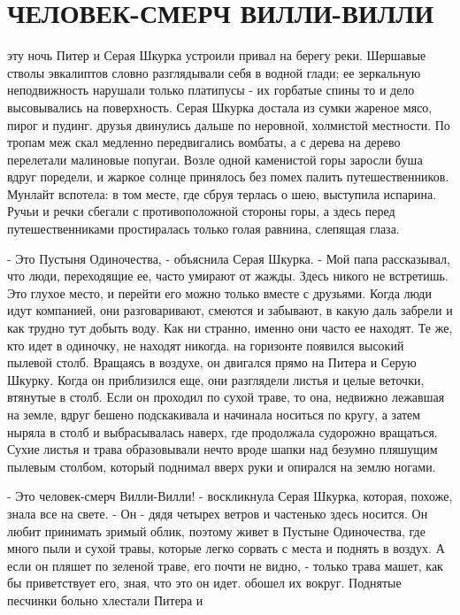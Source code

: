 \chapter{ЧЕЛОВЕК-СМЕРЧ ВИЛЛИ-ВИЛЛИ}
\par{} эту ночь Питер и Серая Шкурка устроили привал на берегу реки. 
Шершавые стволы эвкалиптов словно разглядывали себя в водной глади; ее 
зеркальную неподвижность нарушали только платипусы - их горбатые спины 
то и дело высовывались на поверхность. Серая Шкурка достала из сумки 
жареное мясо, пирог и пудинг.
 друзья двинулись дальше по неровной, холмистой местности. По 
тропам меж скал медленно передвигались вомбаты, а с дерева на дерево 
перелетали малиновые попугаи. Возле одной каменистой горы заросли буша 
вдруг поредели, и жаркое солнце принялось без помех палить 
путешественников. Мунлайт вспотела: в том месте, где сбруя терлась о 
шею, выступила испарина. Ручьи и речки сбегали с противоположной 
стороны горы, а здесь перед путешественниками простиралась только 
голая равнина, слепящая глаза.
\par- Это Пустыня Одиночества, - объяснила Серая Шкурка. - Мой папа 
рассказывал, что люди, переходящие ее, часто умирают от жажды. Здесь 
никого не встретишь. Это глухое место, и перейти его можно только 
вместе с друзьями. Когда люди идут компанией, они разговаривают, 
смеются и забывают, в какую даль забрели и как трудно тут добыть воду. 
Как ни странно, именно они часто ее находят. Те же, кто идет в 
одиночку, не находят никогда.
 на горизонте появился высокий пылевой столб. Вращаясь в 
воздухе, он двигался прямо на Питера и Серую Шкурку. Когда он 
приблизился еще, они разглядели листья и целые веточки, втянутые в 
столб. Если он проходил по сухой траве, то она, недвижно лежавшая на 
земле, вдруг бешено подскакивала и начинала носиться по кругу, а затем 
ныряла в столб и выбрасывалась наверх, где продолжала судорожно 
вращаться. Сухие листья и трава образовывали нечто вроде шапки над 
безумно пляшущим пылевым столбом, который поднимал вверх руки и 
опирался на землю ногами.
\par- Это человек-смерч Вилли-Вилли! - воскликнула Серая Шкурка, 
которая, похоже, знала все на свете. - Он - дядя четырех ветров и 
частенько здесь носится. Он любит принимать зримый облик, поэтому 
живет в Пустыне Одиночества, где много пыли и сухой травы, которые 
легко сорвать с места и поднять в воздух. А если он пляшет по зеленой 
траве, его почти не видно, - только трава машет, как бы приветствует 
его, зная, что это он идет.
 обошел их вокруг. Поднятые песчинки больно хлестали Питера и 
